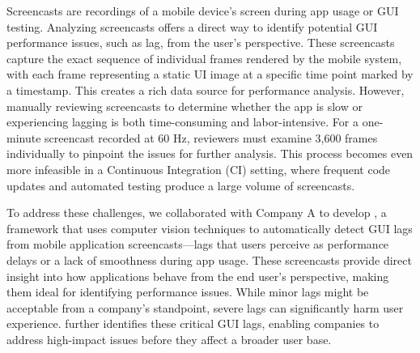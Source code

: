 

Screencasts are recordings of a mobile device’s screen during app usage or GUI testing. Analyzing screencasts offers a direct way to identify potential GUI performance issues, such as lag, from the user's perspective. These screencasts capture the exact sequence of individual frames rendered by the mobile system, with each frame representing a static UI image at a specific time point marked by a timestamp. This creates a rich data source for performance analysis. 
However, manually reviewing screencasts to determine whether the app is slow or experiencing lagging is both time-consuming and labor-intensive. For a one-minute screencast recorded at 60 Hz, reviewers must examine 3,600 frames individually to pinpoint the issues for further analysis. This process becomes even more infeasible in a Continuous Integration (CI) setting, where frequent code updates and automated testing produce a large volume of screencasts.  


To address these challenges, we collaborated with Company A to develop \tool, a framework that uses computer vision techniques to automatically detect GUI lags from mobile application screencasts---lags that users perceive as performance delays or a lack of smoothness during app usage.
These screencasts provide direct insight into how applications behave from the end user’s perspective, making them ideal for identifying performance issues. While minor lags might be acceptable from a company’s standpoint, severe lags can significantly harm user experience. \tool further identifies these critical GUI lags, enabling companies to address high-impact issues before they affect a broader user base.


